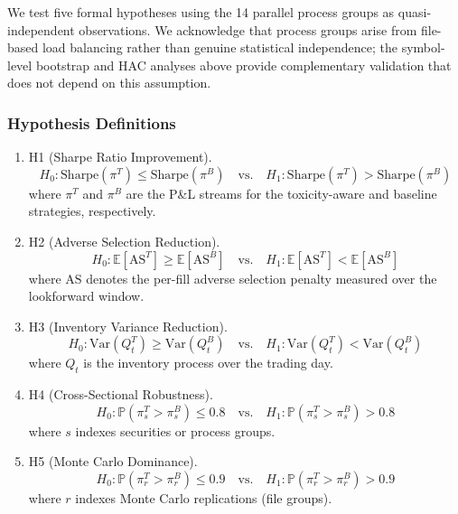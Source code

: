 \documentclass[11pt]{article}
\theoremstyle{definition}
\begin{document}
We test five formal hypotheses using the 14 parallel process groups as quasi-independent observations. We acknowledge that process groups arise from file-based load balancing rather than genuine statistical independence; the symbol-level bootstrap and HAC analyses above provide complementary validation that does not depend on this assumption.

\subsubsection{Hypothesis Definitions}

\begin{enumerate}
\item H1 (Sharpe Ratio Improvement).
\begin{equation}
H_0: \text{Sharpe}(\pi^T) \leq \text{Sharpe}(\pi^B) \quad \text{vs.} \quad H_1: \text{Sharpe}(\pi^T) > \text{Sharpe}(\pi^B)
\end{equation}
where $\pi^T$ and $\pi^B$ are the P\&L streams for the toxicity-aware and baseline strategies, respectively.

\item H2 (Adverse Selection Reduction).
\begin{equation}
H_0: \mathbb{E}[\text{AS}^T] \geq \mathbb{E}[\text{AS}^B] \quad \text{vs.} \quad H_1: \mathbb{E}[\text{AS}^T] < \mathbb{E}[\text{AS}^B]
\end{equation}
where $\text{AS}$ denotes the per-fill adverse selection penalty measured over the lookforward window.

\item H3 (Inventory Variance Reduction).
\begin{equation}
H_0: \text{Var}(Q^T_t) \geq \text{Var}(Q^B_t) \quad \text{vs.} \quad H_1: \text{Var}(Q^T_t) < \text{Var}(Q^B_t)
\end{equation}
where $Q_t$ is the inventory process over the trading day.

\item H4 (Cross-Sectional Robustness).
\begin{equation}
H_0: \mathbb{P}(\pi^T_s > \pi^B_s) \leq 0.8 \quad \text{vs.} \quad H_1: \mathbb{P}(\pi^T_s > \pi^B_s) > 0.8
\end{equation}
where $s$ indexes securities or process groups.

\item H5 (Monte Carlo Dominance).
\begin{equation}
H_0: \mathbb{P}(\pi^T_r > \pi^B_r) \leq 0.9 \quad \text{vs.} \quad H_1: \mathbb{P}(\pi^T_r > \pi^B_r) > 0.9
\end{equation}
where $r$ indexes Monte Carlo replications (file groups).
\end{enumerate}
\end{document}
